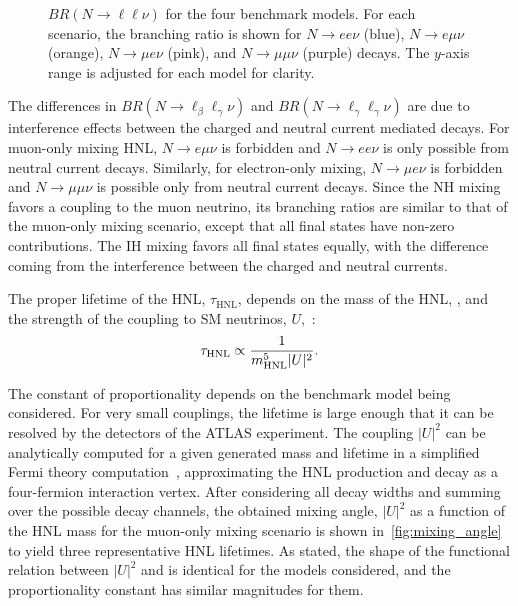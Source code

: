 \begin{figure}[!ht]
    \caption{$BR(N\to \ell\ell\nu)$ for the four benchmark models. For each scenario, the branching ratio is shown for $N\to ee\nu$ (blue), $N\to e\mu\nu$ (orange),  $N\to \mu e\nu$ (pink), and $N\to\mu\mu\nu$ (purple) decays. The $y$-axis range is adjusted for each model for clarity.~\cite{Trischuk:2806047}}
    \label{fig:branching_ratio}
\end{figure}

The differences in $BR(N\to\ell_\beta\ell_\gamma\nu)$ and $BR(N\to\ell_\gamma\ell_\gamma\nu)$ are due to interference effects between the charged and neutral current mediated decays. For muon-only mixing HNL, $N\to e\mu\nu$ is forbidden and $N\to ee\nu$ is only possible from neutral current decays. Similarly, for electron-only mixing, $N\to \mu e\nu$ is forbidden and $N\to \mu\mu\nu$ is possible only from neutral current decays. Since the NH mixing favors a coupling to the muon neutrino, its branching ratios are similar to that of the muon-only mixing scenario, except that all final states have non-zero contributions. The IH mixing favors all final states equally, with the difference coming from the interference between the charged and neutral currents.

The proper lifetime of the HNL, $\tau_\mathrm{HNL}$, depends on the mass of the HNL, \mhnl, and the strength of the coupling to SM neutrinos, $U$,~\cite{PhysRevD.29.2539}:
\begin{equation}
    \tau_\mathrm{HNL} \propto \frac{1}{m_{\mathrm{HNL}}^5 |U|^2}.
\end{equation}

The constant of proportionality depends on the benchmark model being considered. For very small couplings, the lifetime is large enough that it can be resolved by the detectors of the ATLAS experiment. The coupling $|U|^2$ can be analytically computed for a given generated mass and lifetime in a simplified Fermi theory computation~\cite{Bondarenko2018}, approximating the HNL production and decay as a four-fermion interaction vertex. After considering all decay widths and summing over the possible decay channels, the obtained mixing angle, $|U|^2$ as a function of the HNL mass for the muon-only mixing scenario is shown in~\cref{fig:mixing_angle} to yield three representative HNL lifetimes. As stated, the shape of the functional relation between $|U|^2$ and \mhnl is identical for the models considered, and the proportionality constant has similar magnitudes for them.

